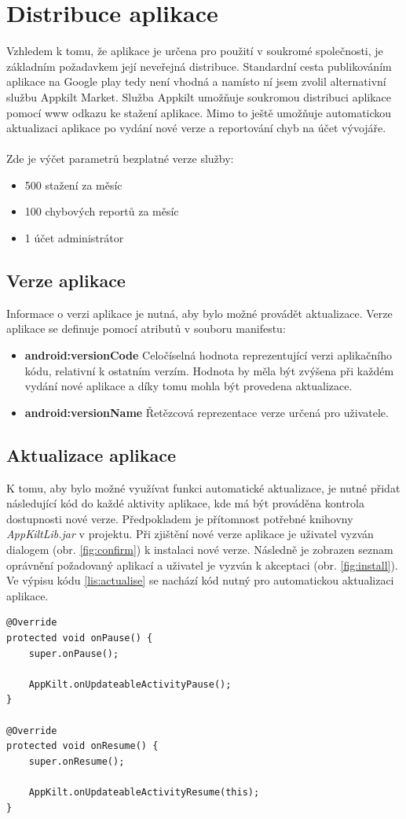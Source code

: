 \documentclass{diplomka}
\begin{document}
\section{Distribuce aplikace}
Vzhledem k tomu, že aplikace je určena pro použití v soukromé společnosti, je základním požadavkem její neveřejná distribuce. Standardní cesta publikováním aplikace na Google play tedy není vhodná a namísto ní jsem zvolil alternativní službu Appkilt Market\cite{appkilt}. Služba Appkilt umožňuje soukromou distribuci aplikace pomocí www odkazu ke stažení aplikace. Mimo to ještě umožňuje automatickou aktualizaci aplikace po vydání nové verze a reportování chyb na účet vývojáře. \\ \\Zde je výčet parametrů bezplatné verze služby:
\begin{itemize}[noitemsep,nolistsep]
\item 500 stažení za měsíc
\item 100 chybových reportů za měsíc
\item 1 účet administrátor
\end{itemize}

\subsection*{Verze aplikace}
Informace o verzi aplikace je nutná, aby bylo možné provádět aktualizace. Verze aplikace se definuje pomocí atributů v souboru manifestu:
\begin{itemize}[noitemsep,nolistsep]
\item \textbf{android:versionCode}
Celočíselná hodnota reprezentující verzi aplikačního kódu, relativní k ostatním verzím. Hodnota by měla být zvýšena při každém vydání nové aplikace a díky tomu mohla být provedena aktualizace.
\item \textbf{android:versionName}
Řetězcová reprezentace verze určená pro uživatele. 
\end{itemize}

\subsection*{Aktualizace aplikace}
K tomu, aby bylo možné využívat funkci automatické aktualizace, je nutné přidat následující kód do každé aktivity aplikace, kde má být prováděna kontrola dostupnosti nové verze. Předpokladem je přítomnost potřebné knihovny \emph{AppKiltLib.jar} v projektu. Při zjištění nové verze aplikace je uživatel vyzván dialogem (obr. \ref{fig:confirm}) k instalaci nové verze. Následně je zobrazen seznam oprávnění požadovaný aplikací a uživatel je vyzván k akceptaci (obr. \ref{fig:install}). Ve výpisu kódu \ref{lis:actualise} se nachází kód nutný pro automatickou aktualizaci aplikace.
\begin{lstlisting}[label=lis:actualise, caption=Kontrola dostupnosti aktualizace] 
@Override
protected void onPause() { 
	super.onPause();

	AppKilt.onUpdateableActivityPause();
}

@Override
protected void onResume() {
	super.onResume();
	
	AppKilt.onUpdateableActivityResume(this);
}
\end{lstlisting}
\end{document}
